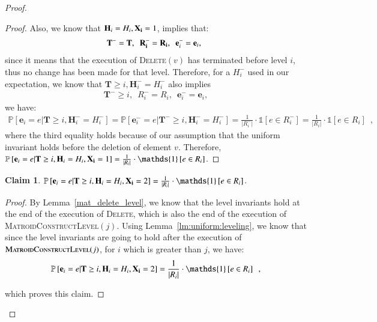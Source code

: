 \documentclass[11pt]{article}
\newtheorem{claim}{Claim}[section]
\renewcommand{\Pr}[1]{\ensuremath{\mathbb{P}\left[#1\right]}}
\newcommand{\ind}[1]{\ensuremath{\mathds{1}\left[#1\right]}}
\newcommand{\MatroidConstLevel}{\textsc{MatroidConstructLevel}}
\newcommand{\deletev}{{\textsc{Delete}}}
\newcommand{\bE}{\ensuremath{\mathbf{e}}}
\newcommand{\bT}{\ensuremath{\mathbf{T}}}
\newcommand{\bH}{\ensuremath{\mathbf{H}}}
\begin{document}
\begin{proof}
\begin{proof}
Also, we know that $\bH_i = H_i, \bold{X_i} = 1$, implies that: 
\begin{align*}
    \bT^- = \bT, \enspace
    \bold{R_i^-} = \bold{R_i}, \enspace
    \bE_i^- = \bE_i, \enspace
\end{align*}
since it means that the execution of \deletev$(v)$ has terminated before level $i$, thus no change has been made for that level.
Therefore, for a $H_i^-$ used in our expectation, we know that $\bT \geq i, \bH_i^- = H_i^-$ also implies 
\begin{align*}
    \bT^- \geq i,  \enspace
    R_i^- = R_i, \enspace
    \bE_i^- = \bE_i,
\end{align*}
we have:
\begin{align*}
    \Pr{\bE_i = e | \bT \geq i, \bH_i^- = H_i^-} = \Pr{\bE_i^- = e | \bT^- \geq i, \bH_i^- = H_i^-} = \frac{1}{|R_i^{-}|} \cdot \ind{e \in R_i^{-}} = \frac{1}{|R_i|} \cdot \ind{e \in R_i} \enspace, 
\end{align*}
where the third equality holds because of our assumption that the uniform invariant holds before the deletion of element $v$.
Therefore, $\Pr{\bE_i = e | \bT \geq i, \bH_i = H_i, \bold{X_i} = 1} = \frac{1}{|R_i|} \cdot \ind{e \in R_i}$.
    
\end{proof}



\begin{claim}
\label{sevomi}
    $\Pr{\bE_i = e | \bT \geq i, \bH_i = H_i, \bold{X_i} = 2}  = \frac{1}{|R_i|}\cdot \ind{e \in R_i}$.
\end{claim}

\begin{proof}
By Lemma~\ref{mat_delete_level}, we know that the level invariants hold at the end of the execution of \deletev{}, which is also the end of the execution of \MatroidConstLevel{$(j)$}. 
Using Lemma~\ref{lm:uniform:leveling}, we know that 
since the level invariants are going to hold after the execution of $\MatroidConstLevel{}(j)$, 
for $i$ which is greater than $j$, we have: 
$$\Pr{\bE_i = e | \bT \geq i, \bH_i = H_i, \bold{X_i} = 2}  = \frac{1}{|R_i|}\cdot \ind{e \in R_i} \enspace, $$

which proves this claim. 
\end{proof}






\end{proof}
\end{document}
